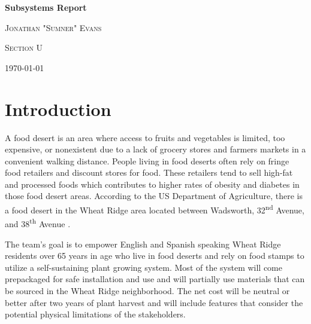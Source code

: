 \documentclass[12pt]{article}
\author{Jonathan "Sumner" Evans}
\date{\today}
\let\supscr=\textsuperscript
\begin{document}
\begin{titlepage}
    \centering
    \vspace{15cm}
    {\huge\bfseries Subsystems Report \par}
    \vspace{1cm}
    {\scshape\Large Jonathan "Sumner" Evans\par}
    \vfill
    {\scshape\large Section U\par}
    {\large \today\par}
    \vfill
\end{titlepage}

\section{Introduction}
A food desert is an area where access to fruits and vegetables is limited, too expensive, or
nonexistent due to a lack of grocery stores and farmers markets in a convenient walking distance.
\cite{cdc-food-deserts} People living in food deserts often rely on fringe food retailers and
discount stores for food. These retailers tend to sell high-fat and processed foods which
contributes to higher rates of obesity and diabetes in those food desert areas. According to the US
Department of Agriculture, there is a food desert in the Wheat Ridge area located between Wadsworth,
32\supscr{nd} Avenue, and 38\supscr{th} Avenue \cite{usda-food-deserts}.

The team’s goal is to empower English and Spanish speaking Wheat Ridge residents over 65 years in
age who live in food deserts and rely on food stamps to utilize a self-sustaining plant growing
system. Most of the system will come prepackaged for safe installation and use and will partially
use materials that can be sourced in the Wheat Ridge neighborhood. The net cost will be neutral or
better after two years of plant harvest and will include features that consider the potential
physical limitations of the stakeholders.
\end{document}
